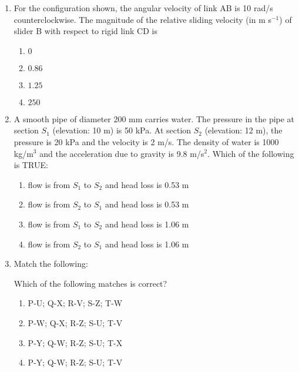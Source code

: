 \documentclass[journal,9pt,onecolumn]{IEEEtran}
\begin{document}
\begin{enumerate}
\item  For the configuration shown, the angular velocity of 
link AB is 10 rad/s counterclockwise. The magnitude of the relative sliding velocity (in m s$^{-1}$) of slider B with respect to rigid link CD is
\begin{center}
    
\end{center}
\begin{multicols}{4}
\begin{enumerate}
    \item $0$
    \item $0.86$
    \item $1.25$
    \item $250$
\end{enumerate}
\end{multicols}


\item A smooth pipe of diameter 200 mm carries water. The pressure in the pipe at section $S_1$ (elevation: 10 m) is 50 kPa. At section $S_2$ (elevation: 12 m), the pressure is 20 kPa and the velocity is 2 m/s. The density of water is 1000 kg/m$^3$ and the acceleration due to gravity is 9.8 m/s$^2$. Which of the following is TRUE:
\begin{enumerate}
    \item flow is from $S_1$ to $S_2$ and head loss is 0.53 m
    \item flow is from $S_2$ to $S_1$ and head loss is 0.53 m
    \item flow is from $S_1$ to $S_2$ and head loss is 1.06 m
    \item flow is from $S_2$ to $S_1$ and head loss is 1.06 m
\end{enumerate}


\item Match the following:
\begin{table}[h!]
 	\centering
 	
 	\label{tab:ME-2010}
 \end{table}
 Which of the following matches is correct?
\begin{multicols}{2}
\begin{enumerate}
    \item P-U; Q-X; R-V; S-Z; T-W
    \item P-W; Q-X; R-Z; S-U; T-V
    \item P-Y; Q-W; R-Z; S-U; T-X
    \item P-Y; Q-W; R-Z; S-U; T-V
\end{enumerate}
\end{multicols}





\end{enumerate}
\end{document}
